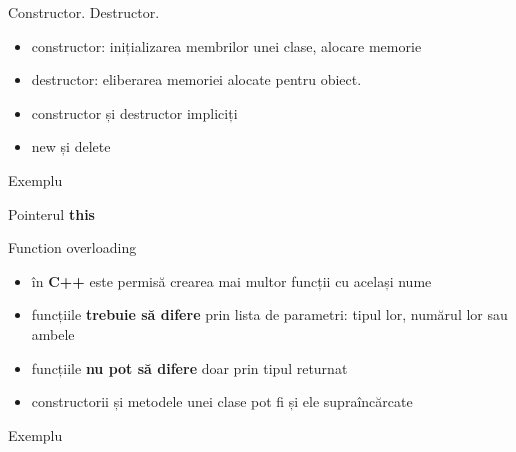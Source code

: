 \documentclass{beamer}
\begin{document}
\begin{frame}{Constructor. Destructor.}
  \begin{itemize}
  \item constructor: inițializarea membrilor unei clase, alocare memorie
  \item destructor: eliberarea memoriei alocate pentru obiect.
  \item constructor și destructor impliciți
  \item new și delete
  \end{itemize}
\end{frame}
             
\begin{frame}{Exemplu}
  \footnotesize{}
\end{frame} 

\begin{frame}{Pointerul \textbf{this}}
\end{frame}

\begin{frame}{Function overloading}
  \begin{itemize}
  \item în \textbf{C++} este permisă crearea mai multor funcții cu același nume 
  \item funcțiile \textbf{trebuie să difere} prin lista de parametri: tipul lor, numărul lor sau ambele
  \item funcțiile \textbf{nu pot să difere} doar prin tipul returnat
  \item constructorii și metodele unei clase pot fi și ele supraîncărcate
  \end{itemize}
\end{frame}

\begin{frame}{Exemplu}
  \footnotesize{}
\end{frame}
\end{document}
